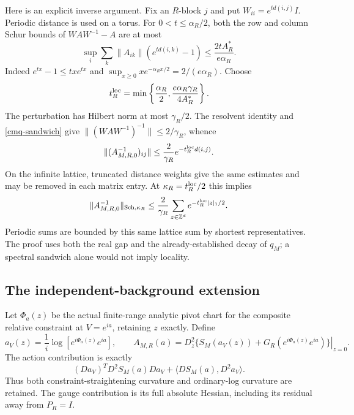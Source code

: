 \documentclass[11pt]{article}
\theoremstyle{remark}
\begin{document}
Here is an explicit inverse argument. Fix an $R$-block $j$ and
put $W_{ii}=e^{t d(i,j)}I$. Periodic distance is used on a torus.
For $0<t\leq\alpha_R/2$, both the row and column Schur bounds
of $WAW^{-1}-A$ are at most
\begin{equation}
 \sup_i\sum_k\|A_{ik}\|(e^{t d(i,k)}-1)
 \leq\frac{2tA_R^*}{e\alpha_R}.
 \label{cmq-conjugation}
\end{equation}
Indeed $e^{tx}-1\leq txe^{tx}$ and
$\sup_{x\geq0}xe^{-\alpha_Rx/2}=2/(e\alpha_R)$.
Choose
\begin{equation}
 t_R^{\rm loc}
 =\min\left\{\frac{\alpha_R}{2},
                  \frac{e\alpha_R\gamma_R}{4A_R^*}\right\}.
 \label{cmq-rate}
\end{equation}
The perturbation has Hilbert norm at most $\gamma_R/2$.
The resolvent identity and \eqref{cmq-sandwich} give
$\|(WAW^{-1})^{-1}\|\leq2/\gamma_R$, whence
\begin{equation}
 \|(A_{M,R,0}^{-1})_{ij}\|
 \leq\frac2{\gamma_R}e^{-t_R^{\rm loc}d(i,j)}.
 \label{cmq-entry-decay}
\end{equation}
On the infinite lattice, truncated distance weights give the
same estimates and may be removed in each matrix entry. At
$\kappa_R=t_R^{\rm loc}/2$ this implies
\begin{equation}
 \|A_{M,R,0}^{-1}\|_{{\rm Sch},\kappa_R}
 \leq\frac2{\gamma_R}
       \sum_{z\in\mathbb Z^d}e^{-t_R^{\rm loc}|z|_1/2}.
 \label{cmq-covariance-schur}
\end{equation}
Periodic sums are bounded by this same lattice sum by shortest
representatives. The proof uses both the real gap and the
already-established decay of $q_M$; a spectral sandwich alone
would not imply locality.

\subsection{The independent-background extension}
\label{cmq-background-section}

Let $\Phi_a(z)$ be the actual finite-range analytic pivot chart
for the composite relative constraint at $V=e^{ia}$, retaining
$z$ exactly. Define
\begin{equation}
 a_V(z)=\frac1i\log[e^{i\Phi_a(z)}e^{ia}],\qquad
 A_{M,R}(a)
 =\left.D_z^2\{S_M(a_V(z))+G_R(e^{i\Phi_a(z)}e^{ia})\}
                                                     \right|_{z=0}.
 \label{cmq-background-precision}
\end{equation}
The action contribution is exactly
\begin{equation}
 (Da_V)^T D^2S_M(a)Da_V+\langle DS_M(a),D^2a_V\rangle.
 \label{cmq-chain-rule}
\end{equation}
Thus both constraint-straightening curvature and ordinary-log
curvature are retained. The gauge contribution is its full
absolute Hessian, including its residual away from $P_R=I$.
\end{document}
